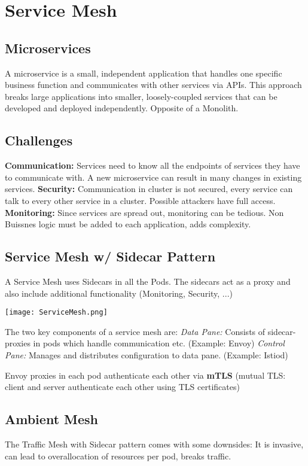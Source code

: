 \section{Service Mesh}
\subsection{Microservices}
A microservice is a small, independent application that handles one specific business function and communicates with other services via APIs. This approach breaks large applications into smaller, loosely-coupled services that can be developed and deployed independently. Opposite of a Monolith.
\subsection{Challenges}
\textbf{Communication:} Services need to know all the endpoints of services they have to communicate with. A new microservice can result in many changes in existing services.
\textbf{Security:} Communication in cluster is not secured, every service can talk to every other service in a cluster. Possible attackers have full access.
\textbf{Monitoring:} Since services are spread out, monitoring can be tedious. Non Buissnes logic must be added to each application, adds complexity.
\subsection{Service Mesh w/ Sidecar Pattern}
A Service Mesh uses Sidecars in all the Pods. The sidecars act as a proxy and also include additional functionality (Monitoring, Security, ...)


\texttt{[image: ServiceMesh.png]}

The two key components of a service mesh are:
\textit{Data Pane:} Consists of sidecar-proxies in pods which handle communication etc. (Example: Envoy)
\textit{Control Pane:} Manages and distributes configuration to data pane. (Example: Istiod)

Envoy proxies in each pod authenticate each other via \textbf{mTLS} (mutual TLS: client and server authenticate each other using TLS certificates)

\subsection{Ambient Mesh}
The Traffic Mesh with Sidecar pattern comes with some downsides: It is invasive, can lead to overallocation of resources per pod, breaks traffic.

